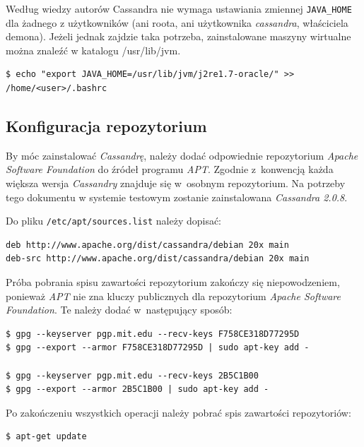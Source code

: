 \documentclass{article} %
\begin{document}
Według wiedzy autorów Cassandra nie wymaga ustawiania zmiennej \lstinline[style=bash]!JAVA_HOME! dla żadnego z użytkowników (ani roota, ani użytkownika \textit{cassandra}, właściciela demona). Jeżeli jednak zajdzie taka potrzeba, zainstalowane maszyny wirtualne można znaleźć w katalogu /usr/lib/jvm.

\begin{lstlisting}[style=bash, caption={ustawianie JAVA\textunderscore HOME}]
$ echo "export JAVA_HOME=/usr/lib/jvm/j2re1.7-oracle/" >> /home/<user>/.bashrc
\end{lstlisting}

\subsection{Konfiguracja repozytorium}\label{subsec:install_repo}

By móc zainstalować \emph{Cassandrę}, należy dodać odpowiednie repozytorium \emph{Apache Software Foundation} do źródeł programu \emph{APT}.
Zgodnie z~konwencją każda większa wersja \emph{Cassandry} znajduje się w~osobnym repozytorium.
Na potrzeby tego dokumentu w systemie testowym zostanie zainstalowana \emph{Cassandra 2.0.8}.

Do pliku \texttt{/etc/apt/sources.list} należy dopisać:

\begin{lstlisting}[style=bash, caption={nowe źródła pakietów dla \emph{APTa}}]
deb http://www.apache.org/dist/cassandra/debian 20x main
deb-src http://www.apache.org/dist/cassandra/debian 20x main
\end{lstlisting}

Próba pobrania spisu zawartości repozytorium zakończy się niepowodzeniem, ponieważ \emph{APT} nie zna kluczy publicznych dla repozytorium \emph{Apache Software Foundation}.
Te należy dodać w~następujący sposób:

\begin{lstlisting}[style=bash, caption={pobieranie kluczy publicznych repozytorium \emph{ASF}}]
$ gpg --keyserver pgp.mit.edu --recv-keys F758CE318D77295D
$ gpg --export --armor F758CE318D77295D | sudo apt-key add -

$ gpg --keyserver pgp.mit.edu --recv-keys 2B5C1B00
$ gpg --export --armor 2B5C1B00 | sudo apt-key add -
\end{lstlisting}

Po zakończeniu wszystkich operacji należy pobrać spis zawartości repozytoriów:
\begin{lstlisting}[style=bash, caption={odświeżanie list pakietów}]
$ apt-get update
\end{lstlisting}
\end{document}
